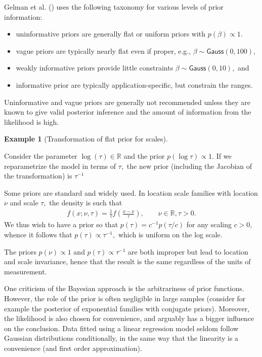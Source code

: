 \documentclass[
  11pt,
  letterpaper,
]{scrbook}
\providecommand{\tightlist}{%
  \setlength{\itemsep}{0pt}\setlength{\parskip}{0pt}}
\theoremstyle{definition}
\newtheorem{example}{Example}[chapter]
\theoremstyle{plain}
\theoremstyle{plain}
\theoremstyle{plain}
\theoremstyle{definition}
\theoremstyle{definition}
\theoremstyle{plain}
\theoremstyle{plain}
\theoremstyle{remark}
\begin{document}
Gelman et al. () uses the following
taxonomy for various levels of prior information:

\begin{itemize}
\tightlist
\item
  uninformative priors are generally flat or uniform priors with
  \(p(\beta) \propto 1.\)
\item
  vague priors are typically nearly flat even if proper, e.g.,
  \(\beta \sim \mathsf{Gauss}(0, 100),\)
\item
  weakly informative priors provide little constraints
  \(\beta \sim \mathsf{Gauss}(0, 10),\) and
\item
  informative prior are typically application-specific, but constrain
  the ranges.
\end{itemize}

Uninformative and vague priors are generally not recommended unless they
are known to give valid posterior inference and the amount of
information from the likelihood is high.

\begin{example}[Transformation of flat prior for
scales]\protect\hypertarget{exm-scaleflatprior}{}\label{exm-scaleflatprior}

Consider the parameter \(\log(\tau) \in \mathbb{R}\) and the prior
\(p( \log \tau) \propto 1.\) If we reparametrize the model in terms of
\(\tau,\) the new prior (including the Jacobian of the transformation)
is \(\tau^{-1}\)

\end{example}

Some priors are standard and widely used. In location scale families
with location \(\nu\) and scale \(\tau,\) the density is such that
\begin{align*}
f(x; \nu, \tau) =  \frac{1}{\tau} f\left(\frac{x - \nu}{\tau}\right), \qquad \nu \in \mathbb{R}, \tau >0.
\end{align*} We thus wish to have a prior so that
\(p(\tau) = c^{-1}p(\tau/c)\) for any scaling \(c>0,\) whence it follows
that \(p(\tau) \propto \tau^{-1},\) which is uniform on the log scale.

The priors \(p(\nu) \propto 1\) and \(p(\tau) \propto \tau^{-1}\) are
both improper but lead to location and scale invariance, hence that the
result is the same regardless of the units of measurement.

One criticism of the Bayesian approach is the arbitrariness of prior
functions. However, the role of the prior is often negligible in large
samples (consider for example the posterior of exponential families with
conjugate priors). Moreover, the likelihood is also chosen for
convenience, and arguably has a bigger influence on the conclusion. Data
fitted using a linear regression model seldom follow Gaussian
distributions conditionally, in the same way that the linearity is a
convenience (and first order approximation).
\end{document}
